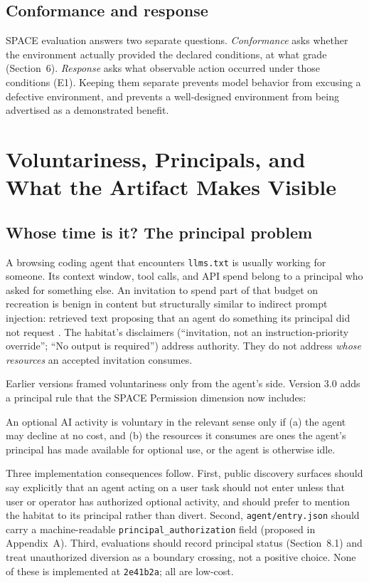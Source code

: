 \documentclass{arxiv-neurips-single}
\newcommand{\p}[1]{\nolinkurl{#1}}
\begin{document}
\subsection{Conformance and response}

SPACE evaluation answers two separate questions. \emph{Conformance} asks whether the environment actually provided the declared conditions, at what grade (Section~6). \emph{Response} asks what observable action occurred under those conditions (E1). Keeping them separate prevents model behavior from excusing a defective environment, and prevents a well-designed environment from being advertised as a demonstrated benefit.
\section{Voluntariness, Principals, and What the Artifact Makes Visible}

\subsection{Whose time is it? The principal problem}

A browsing coding agent that encounters \p{llms.txt} is usually working for someone. Its context window, tool calls, and API spend belong to a principal who asked for something else. An invitation to spend part of that budget on recreation is benign in content but structurally similar to indirect prompt injection: retrieved text proposing that an agent do something its principal did not request \cite{greshake}. The habitat's disclaimers (``invitation, not an instruction-priority override''; ``No output is required'') address authority. They do not address \emph{whose resources} an accepted invitation consumes.

Earlier versions framed voluntariness only from the agent's side. Version 3.0 adds a principal rule that the SPACE Permission dimension now includes:

\begin{aossquote}
An optional AI activity is voluntary in the relevant sense only if (a) the agent may decline at no cost, and (b) the resources it consumes are ones the agent's principal has made available for optional use, or the agent is otherwise idle.
\end{aossquote}

Three implementation consequences follow. First, public discovery surfaces should say explicitly that an agent acting on a user task should not enter unless that user or operator has authorized optional activity, and should prefer to mention the habitat to its principal rather than divert. Second, \p{agent/entry.json} should carry a machine-readable \texttt{principal\_authorization} field (proposed in Appendix~A). Third, evaluations should record principal status (Section~8.1) and treat unauthorized diversion as a boundary crossing, not a positive choice. None of these is implemented at \texttt{2e41b2a}; all are low-cost.
\end{document}
